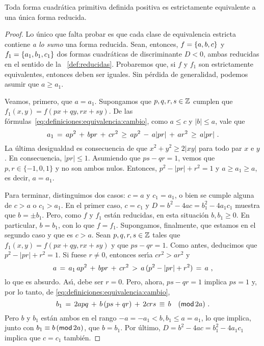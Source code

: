 \begin{teoReducidas}\label{teo:reducidas}
	Toda forma cuadr\'atica primitiva definida positiva es
	estrictamente equivalente a una \'unica forma reducida.
\end{teoReducidas}

\begin{proof}
	Lo \'unico que falta probar es que cada clase de equivalencia
	estricta contiene \emph{a lo sumo} una forma reducida.
	Sean, entonces, $f=\binaria{a,b,c}$ y $f_1=\binaria{a_1,b_1,c_1}$
	dos formas cuadr\'aticas de discriminante $D<0$, ambas reducidas
	en el sentido de la ~\ref{def:reducidas}.
	Probaremos que, si $f$ y $f_1$ son estrictamente equivalentes,
	entonces deben ser iguales.
	Sin p\'erdida de generalidad, podemos asumir que $a\geq a_1$.	

	Veamos, primero, que $a=a_1$. Supongamos que $p,q,r,s\in\Enteros$
	cumplen que
	\begin{math}
		f_1(x,y)=f(px+qy,rx+sy)
	\end{math}.
	De las f\'ormulas~\eqref{eq:definiciones:equivalencia:cambio},
	como $a\leq c$ y $|b|\leq a$, vale que
	\begin{displaymath}
		a_1\,=\,ap^2\,+\,bpr\,+\,cr^2
		\,\geq\,ap^2\,-\,a|pr|\,+\,ar^2\,\geq\,a|pr|
		\dispstop
	\end{displaymath}
	La \'ultima desigualdad es consecuencia de que
	$x^2+y^2\geq 2|xy|$ para todo par $x$ e $y$. En consecuencia,
	$|pr|\leq 1$. Asumiendo que $ps-qr=1$, vemos que
	$p,r\in\{-1,0,1\}$ y no son ambos nulos.
	Entonces, $p^2-|pr|+r^2=1$ y $a\geq a_1\geq a$, es decir, $a=a_1$.

	Para terminar, distinguimos dos casos: $c=a$ y $c_1=a_1$, o bien
	se cumple alguna de $c>a$ o $c_1>a_1$. En el primer caso, $c=c_1$
	y $D=b^2-4ac=b_1^2-4a_1c_1$ muestra que $b=\pm b_1$. Pero, como
	$f$ y $f_1$ est\'an reducidas, en esta situaci\'on $b,b_1\geq 0$.
	En particular, $b=b_1$, con lo que $f=f_1$. Supongamos, finalmente,
	que estamos en el segundo caso y que es $c>a$.
	Sean $p,q,r,s\in\Enteros$ tales que
	\begin{math}
		f_1(x,y)=f(px+qy,rx+sy)
	\end{math}
	y que $ps-qr=1$. Como antes, deducimos que $p^2-|pr|+r^2=1$.
	Si fuese $r\neq 0$, entonces ser\'{\i}a $cr^2>ar^2$ y
	\begin{displaymath}
		a\,=\,a_1\,ap^2\,+\,bpr\,+\,cr^2\,>\,
			a\,(p^2-|pr|+r^2)\,=\,a
		\dispcomma
	\end{displaymath}
	lo que es absurdo. As\'{\i}, debe ser $r=0$. Pero, ahora,
	$ps-qr=1$ implica $ps=1$ y, por lo tanto, de
	\eqref{eq:definiciones:equivalencia:cambio},
	\begin{displaymath}
		b_1\,=\,2apq\,+\,b\,(ps+qr)\,+\,2crs\,\equiv\,b\modulo[2a]
		\dispstop
	\end{displaymath}
	Pero $b$ y $b_1$ est\'an ambos en el rango
	$-a=-a_1<b,b_1\leq a=a_1$, lo que implica, junto con
	$b_1\equiv b\tmodulo[2a]$, que $b=b_1$. Por \'ultimo,
	$D=b^2-4ac=b_1^2-4a_1c_1$ implica que $c=c_1$ tambi\'en.
\end{proof}

